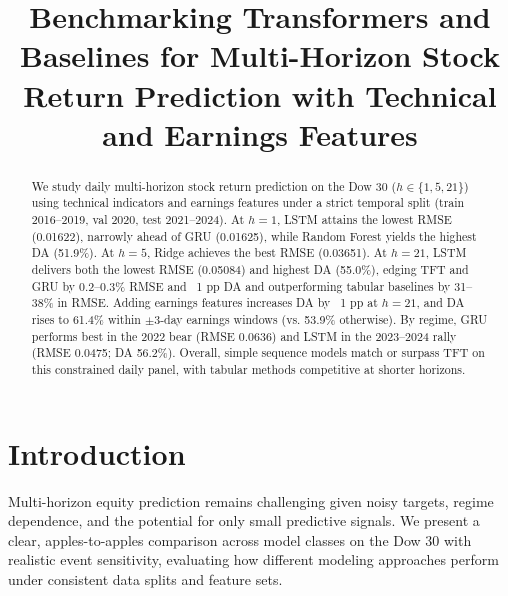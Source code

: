 \documentclass[conference,a4paper]{IEEEtran}
\begin{document}
\title{Benchmarking Transformers and Baselines for Multi-Horizon Stock Return Prediction with Technical and Earnings Features}


\author{}

\maketitle

\begin{abstract}
We study daily multi-horizon stock return prediction on the Dow 30 ($h \in \{1,5,21\}$) using technical indicators and earnings features under a strict temporal split (train 2016--2019, val 2020, test 2021--2024). At $h{=}1$, LSTM attains the lowest RMSE (0.01622), narrowly ahead of GRU (0.01625), while Random Forest yields the highest DA (51.9\%). At $h{=}5$, Ridge achieves the best RMSE (0.03651). At $h{=}21$, LSTM delivers both the lowest RMSE (0.05084) and highest DA (55.0\%), edging TFT and GRU by 0.2--0.3\% RMSE and ~1 pp DA and outperforming tabular baselines by 31--38\% in RMSE. Adding earnings features increases DA by ~1 pp at $h{=}21$, and DA rises to 61.4\% within $\pm 3$-day earnings windows (vs. 53.9\% otherwise). By regime, GRU performs best in the 2022 bear (RMSE 0.0636) and LSTM in the 2023--2024 rally (RMSE 0.0475; DA 56.2\%). Overall, simple sequence models match or surpass TFT on this constrained daily panel, with tabular methods competitive at shorter horizons.
\end{abstract}

\section{Introduction}
Multi-horizon equity prediction remains challenging given noisy targets, regime dependence, and the potential for only small predictive signals. We present a clear, apples-to-apples comparison across model classes on the Dow 30 with realistic event sensitivity, evaluating how different modeling approaches perform under consistent data splits and feature sets.
\end{document}
